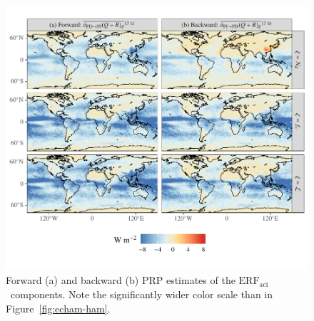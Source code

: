 \documentclass[acp, manuscript]{copernicus}\usepackage[]{graphicx}\usepackage[]{color}
\newcommand\erfaci{\ensuremath{\text{ERF}_\text{aci}}}
\begin{document}
\clearpage

\appendixfigures

\begin{figure}[t]
  \centering
  


{\centering \includegraphics[width=\textwidth]{figure/erf-prp-erf-fw-pd-pi-1} 

}



\caption{Forward (a) and backward (b) PRP estimates of the \erfaci\ components.
  Note the significantly wider color scale than in Figure~\ref{fig:echam-ham}.}
  \label{fig:fw-bk-pd-pi}
\end{figure}

\clearpage
\end{document}

